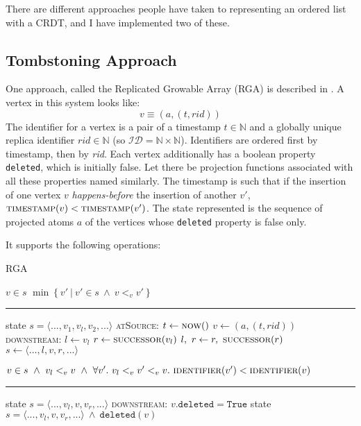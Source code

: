 \documentclass[diss.tex]{subfiles}
\begin{document}
There are different approaches people have taken to representing an ordered list with a CRDT, and I have implemented two of these.
%
%

%
\subsection{Tombstoning Approach}
One approach, called the Replicated Growable Array (RGA) is described in \cite{shapstudy}. A vertex in this system looks like:
$$ v \equiv (a, (t, rid))$$
 The identifier for a vertex is a pair of a timestamp $t \in \mathbb{N}$ and a globally unique replica identifier $rid \in \mathbb{N}$ (so $\mathcal{ID} = \mathbb{N} \times \mathbb{N}$). Identifiers are ordered first by timestamp, then by \textit{rid}. Each vertex additionally has a boolean property \texttt{deleted}, which is initially false. Let there be projection functions associated with all these properties named similarly. The timestamp is such that if the insertion of one vertex $v$ \textit{happens-before} the insertion of another $v'$, $\textsc{timestamp}(v) < \textsc{timestamp}(v')$.
The state represented is the sequence of projected atoms $a$ of the vertices whose \texttt{deleted} property is false only. 


%
%
%
%
%
%
%
%
%
%
%
It supports the following operations:
\begin{algorithm}[H]
\caption*{RGA}
\begin{algorithmic}[1]
\Require $v \in s$
\State \Return $\min \left\{ v' ~|~ v' \in s ~\wedge~ v <_v v'  \right\}$
\EndFunction
\end{algorithmic}

\hrule

\begin{algorithmic}[1]
\Require state $s = \langle ..., v_1, v_l, v_2, ...\rangle$
\BState \textsc{atSource}:
\State $t \gets \Call{now}{ }$
\State $v \gets (a,(t, rid))$
\BState \textsc{downstream}:
\State $l \gets v_l$
\State $r \gets \Call{successor}{v_l}$
\State $l,~r \gets r, ~\Call{successor}{r}$
\EndWhile
\State $s \gets \langle ..., l, v, r, ...\rangle$
\EndFunction

\Ensure $v \in s ~\wedge~ v_l <_v v ~\wedge~ \forall v'.~ v_l<_v v'<_v v. ~\textsc{identifier}(v') < \textsc{identifier}(v)$
\end{algorithmic}

\hrule

\begin{algorithmic}[1]
\Require state $s = \langle ..., v_l, v, v_r, ... \rangle$
\BState \textsc{downstream}:
\State $v.\mathtt{deleted} = \mathtt{True}$
\EndIf
\EndFunction
\Ensure state $s = \langle ..., v_l, v, v_r, ... \rangle ~\wedge~ \mathtt{deleted}(v)$
\end{algorithmic}
\end{algorithm}
\end{document}
